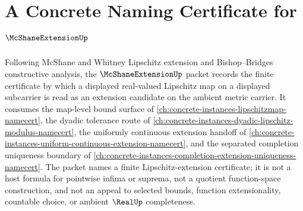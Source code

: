 \chapter{A Concrete Naming Certificate for $\McShaneExtensionUp$}
\label{ch:concrete-instances-mcshane-extension-namecert}

Following McShane and Whitney Lipschitz extension and Bishop--Bridges constructive analysis, the $\McShaneExtensionUp$ packet records the finite certificate by which a displayed real-valued Lipschitz map on a displayed subcarrier is read as an extension candidate on the ambient metric carrier. It consumes the map-level bound surface of \autoref{ch:concrete-instances-lipschitzmap-namecert}, the dyadic tolerance route of \autoref{ch:concrete-instances-dyadic-lipschitz-modulus-namecert}, the uniformly continuous extension handoff of \autoref{ch:concrete-instances-uniform-continuous-extension-namecert}, and the separated completion uniqueness boundary of \autoref{ch:concrete-instances-completion-extension-uniqueness-namecert}. The packet names a finite Lipschitz-extension certificate; it is not a host formula for pointwise infima or suprema, not a quotient function-space construction, and not an appeal to selected bounds, function extensionality, countable choice, or ambient $\RealUp$ completeness.

